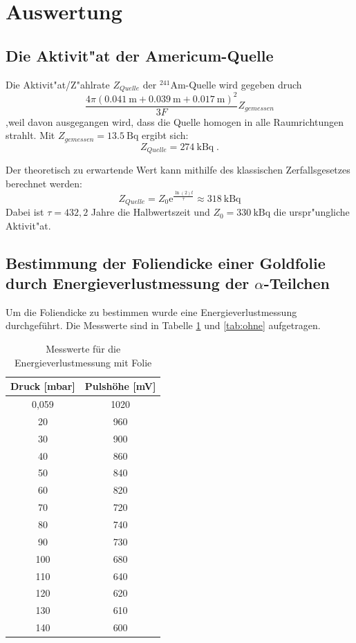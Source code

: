 \section{Auswertung}
\label{sec:Auswertung}

\subsection{Die Aktivit"at der Americum-Quelle}
  Die Aktivit"at/Z"ahlrate $Z_{Quelle}$ der $^{241}\text{Am}$-Quelle wird gegeben druch
  \begin{equation}
    \frac{4\pi(\SI{0,041}{\meter}+\SI{0,039}{\meter}+\SI{0.017}{\meter})^2}{3F}Z_{gemessen}
  \end{equation}
  ,weil davon ausgegangen wird, dass die Quelle homogen in alle Raumrichtungen strahlt.
  Mit $Z_{gemessen}=\SI{13,5}{\becquerel}$ ergibt sich:
  \begin{equation}
    Z_{Quelle} = \SI{274}{\kilo \becquerel} \; .
  \end{equation}

  Der theoretisch zu erwartende Wert kann mithilfe des klassischen Zerfallsgesetzes berechnet werden:
  \begin{equation}
    Z_{Quelle} = Z_0\text{e}^{\frac{\ln(2)t}{\tau}} \approx \SI{318}{\kilo \becquerel}
  \end{equation}
  Dabei ist $\tau=432,2$ Jahre die Halbwertszeit und $Z_0=\SI{330}{\kilo \becquerel}$ \cite{Anleitung} die urspr"ungliche Aktivit"at.


\subsection{\texorpdfstring{Bestimmung der Foliendicke einer Goldfolie durch Energieverlustmessung der $\alpha$-Teilchen}{Bestimmung der Foliendicke einer Goldfolie durch Energieverlustmessung der alpha-Teilchen}}
Um die Foliendicke zu bestimmen wurde eine Energieverlustmessung durchgeführt. Die Messwerte sind in Tabelle \ref{tab:mit} und \ref{tab:ohne} aufgetragen. 
\begin{table}[H] 
	\centering
	\begin{tabular}{c|c}

		Druck  [mbar]& Pulshöhe [mV] \\ 
		\hline 
0,059	&1020 \\
20	&960 \\
30	&900\\
40	&860\\
50	&840\\
60	&820\\
70	&720\\
80	&740\\
90	&730\\
100	&680\\
110	&640\\
120	&620\\
130	&610\\
140	&600\\	
		
	\end{tabular} 
	\caption{Messwerte für die Energieverlustmessung mit Folie } 
	  \label{tab:mit}
\end{table}  

